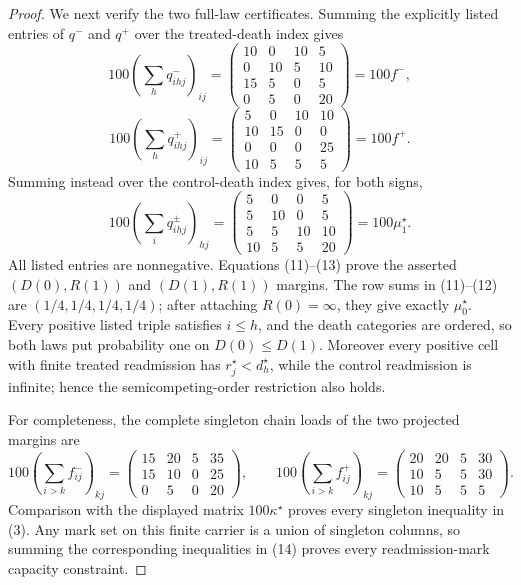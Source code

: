 \documentclass{article}
\begin{document}
\begin{proof}
We next verify the two full-law certificates.  Summing the explicitly listed entries of \(q^-\) and \(q^+\) over the treated-death index gives
\[
100\left(\sum_hq^-_{ihj}\right)_{ij}
=
\begin{pmatrix}
10&0&10&5\\
0&10&5&10\\
15&5&0&5\\
0&5&0&20
\end{pmatrix}
=100f^-,
\tag{11}
\]
\[
100\left(\sum_hq^+_{ihj}\right)_{ij}
=
\begin{pmatrix}
5&0&10&10\\
10&15&0&0\\
0&0&0&25\\
10&5&5&5
\end{pmatrix}
=100f^+.
\tag{12}
\]
Summing instead over the control-death index gives, for both signs,
\[
100\left(\sum_iq^\pm_{ihj}\right)_{hj}
=
\begin{pmatrix}
5&0&0&5\\
5&10&0&5\\
5&5&10&10\\
10&5&5&20
\end{pmatrix}
=100\mu_1^\star. \tag{13}
\]
All listed entries are nonnegative.  Equations (11)--(13) prove the asserted \((D(0),R(1))\) and \((D(1),R(1))\) margins.  The row sums in (11)--(12) are \((1/4,1/4,1/4,1/4)\); after attaching \(R(0)=\infty\), they give exactly \(\mu_0^\star\).  Every positive listed triple satisfies \(i\leq h\), and the death categories are ordered, so both laws put probability one on \(D(0)\leq D(1)\).  Moreover every positive cell with finite treated readmission has \(r_j^\star<d_h^\star\), while the control readmission is infinite; hence the semicompeting-order restriction also holds.

For completeness, the complete singleton chain loads of the two projected margins are
\[
100\left(\sum_{i>k}f^-_{ij}\right)_{kj}
=
\begin{pmatrix}
15&20&5&35\\
15&10&0&25\\
0&5&0&20
\end{pmatrix},
\qquad
100\left(\sum_{i>k}f^+_{ij}\right)_{kj}
=
\begin{pmatrix}
20&20&5&30\\
10&5&5&30\\
10&5&5&5
\end{pmatrix}. \tag{14}
\]
Comparison with the displayed matrix \(100\kappa^\star\) proves every singleton inequality in (3).  Any mark set on this finite carrier is a union of singleton columns, so summing the corresponding inequalities in (14) proves every readmission-mark capacity constraint.


\end{proof}
\end{document}
